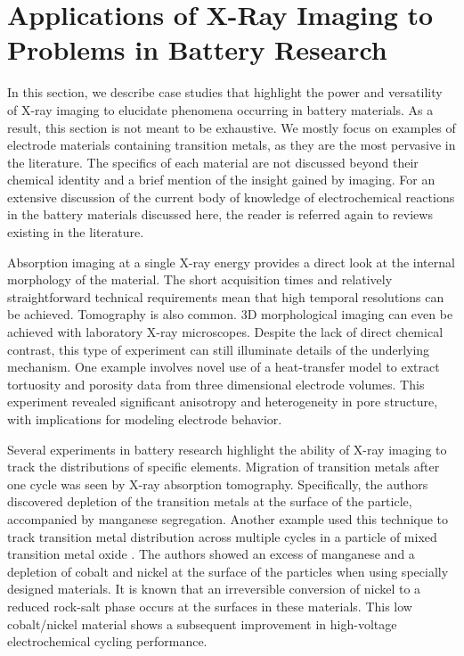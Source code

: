 \documentclass[journal=cmatex,manuscript=perspective]{achemso}
\begin{document}
\section{Applications of X-Ray Imaging to Problems in Battery Research}

In this section, we describe case studies that highlight the power and
versatility of X-ray imaging to elucidate phenomena occurring in
battery materials. As a result, this section is not meant to be
exhaustive. We mostly focus on examples of electrode materials
containing transition metals, as they are the most pervasive in the
literature. The specifics of each material are not discussed beyond
their chemical identity and a brief mention of the insight gained by
imaging. For an extensive discussion of the current body of knowledge
of electrochemical reactions in the battery materials discussed here,
the reader is referred again to reviews existing in the
literature\cite{whittingham2014, balogun2016}.

Absorption imaging at a single X-ray energy provides a direct look at
the internal morphology of the material. The short acquisition times
and relatively straightforward technical requirements mean that high
temporal resolutions can be achieved. Tomography is also common. 3D
morphological imaging can even be achieved with laboratory X-ray
microscopes\cite{shearing2014-2}. Despite the lack of direct chemical
contrast, this type of experiment can still illuminate details of the
underlying mechanism. One example involves novel use of a
heat-transfer model to extract tortuosity and porosity data from three
dimensional electrode volumes. This experiment revealed significant
anisotropy and heterogeneity in pore structure, with implications for
modeling electrode behavior\cite{shearing2014}.

Several experiments in battery research highlight the ability of X-ray
imaging to track the distributions of specific elements. Migration of
transition metals after one cycle was seen by X-ray absorption
tomography\cite{yang2014-2}. Specifically, the authors discovered
depletion of the transition metals at the surface of the particle,
accompanied by manganese segregation. Another example used this
technique to track transition metal distribution across multiple
cycles in a particle of mixed transition metal
oxide \cite{lin2016}. The authors showed an
excess of manganese and a depletion of cobalt and nickel at the
surface of the particles when using specially designed materials. It
is known that an irreversible conversion of nickel to a reduced
rock-salt phase occurs at the surfaces in these materials. This low
cobalt/nickel material shows a subsequent improvement in high-voltage
electrochemical cycling performance.
\end{document}
